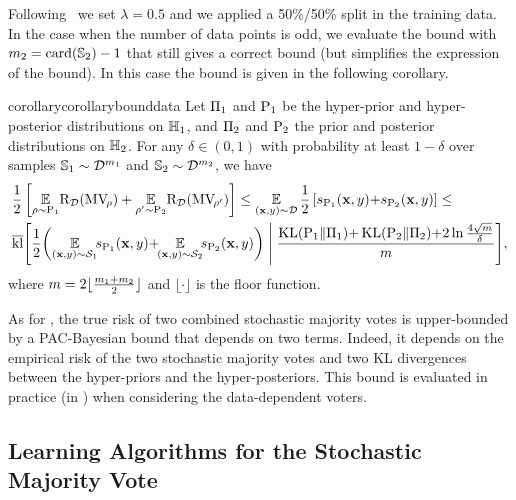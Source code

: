 Following~\citet{MhammediGrunwaldGuedj2019} we set $\lambda=0.5$ and we applied a 50\%/50\% split in the training data.
In the case when the number of data points is odd, we evaluate the bound with $m_2=\operatorname{card}(\mathbb{S}_2)-1$ that still gives a correct bound (but simplifies the expression of the bound).
In this case the bound is given in the following corollary.

\begin{restatable}{corollary}{corollarybounddata}\label{chap:mv-sto:corollary:bound-data}
Let $\Pi_1$ and $\mathrm{P}_1$ be the hyper-prior and hyper-posterior distributions on $\mathbb{H}_1$, and $\Pi_2$ and $\mathrm{P}_2$ the prior and posterior distributions on $\mathbb{H}_2$.
For any $\delta \in (0,1)$ with probability at least $1{-}\delta$ over samples $\mathbb{S}_1\sim\mathcal{D}^{m_1}$ and $\mathbb{S}_2\sim\mathcal{D}^{m_2}$, 
we have
\begin{align*}
    &\frac{1}{2}\LB\EE_{\Q\sim\hyperQ_1}\!\Risk_{\D}(\MVQ) +\EE_{\Qp\sim\hyperQ_2}\!\Risk_{\D}(\MVQp)\RB \le \EE_{(\x,\y)\sim\D} \frac{1}{2}\LB s_{\hyperQ_1}(\x,\y){+}s_{\hyperQ_2}(\x,\y) \RB \le\\ 
    &\klmax\!\LB \frac{1}{2}\!\LP\EE_{(\x,\y)\sim\dS_1}\!\!s_{\hyperQ_1}(\x, \y){+}\!\!\EE_{(\x,\y)\sim\dS_2}\!\!s_{\hyperQ_2}(\x, \y)\RP \;\middle|\; \frac{\KL(\hyperQ_1\|\hyperP_1){+}\KL(\hyperQ_2\|\hyperP_2){+}2\ln\tfrac{4\sqrt{\m}}{\delta}}{\m}\RB\!,
\end{align*}
where $m=2\lfloor\frac{m_1{+}m_2}{2}\rfloor$ and $\lfloor\cdot\rfloor$ is the floor function.
\end{restatable}

As for , the true risk of two combined stochastic majority votes is upper-bounded by a PAC-Bayesian bound that depends on two terms.
Indeed, it depends on the empirical risk of the two stochastic majority votes and two KL divergences between the hyper-priors and the hyper-posteriors.
This bound is evaluated in practice (in ) when considering the data-dependent voters. 

\subsection{Learning Algorithms for the Stochastic Majority Vote}
\label{chap:mv-sto:sec:algo}

